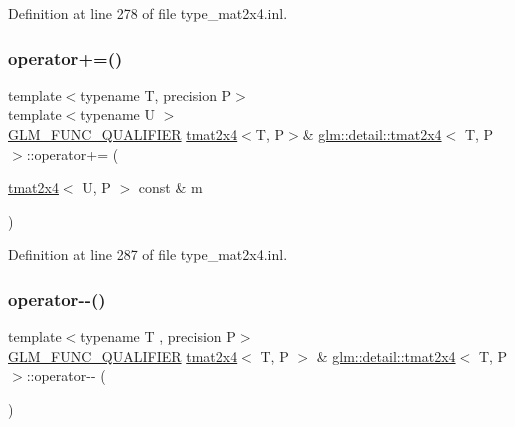 Definition at line 278 of file type\+\_\+mat2x4.\+inl.

\mbox{\label{structglm_1_1detail_1_1tmat2x4_af83887f4894721e8b28d9253fb616700}} 
\subsubsection{\texorpdfstring{operator+=()}{operator+=()}\hspace{0.1cm}{\footnotesize\ttfamily [4/4]}}
{\footnotesize\ttfamily template$<$typename T, precision P$>$ \\
template$<$typename U $>$ \\
\hyperlink{setup_8hpp_a33fdea6f91c5f834105f7415e2a64407}{G\+L\+M\+\_\+\+F\+U\+N\+C\+\_\+\+Q\+U\+A\+L\+I\+F\+I\+ER} \hyperlink{structglm_1_1detail_1_1tmat2x4}{tmat2x4}$<$T, P$>$\& \hyperlink{structglm_1_1detail_1_1tmat2x4}{glm\+::detail\+::tmat2x4}$<$ T, P $>$\+::operator+= (\begin{DoxyParamCaption}\item[{\hyperlink{structglm_1_1detail_1_1tmat2x4}{tmat2x4}$<$ U, P $>$ const \&}]{m }\end{DoxyParamCaption})}



Definition at line 287 of file type\+\_\+mat2x4.\+inl.

\mbox{\label{structglm_1_1detail_1_1tmat2x4_a556fd133fa224ffb3d2ebf13d727d820}} 
\subsubsection{\texorpdfstring{operator-\/-\/()}{operator--()}\hspace{0.1cm}{\footnotesize\ttfamily [1/2]}}
{\footnotesize\ttfamily template$<$typename T , precision P$>$ \\
\hyperlink{setup_8hpp_a33fdea6f91c5f834105f7415e2a64407}{G\+L\+M\+\_\+\+F\+U\+N\+C\+\_\+\+Q\+U\+A\+L\+I\+F\+I\+ER} \hyperlink{structglm_1_1detail_1_1tmat2x4}{tmat2x4}$<$ T, P $>$ \& \hyperlink{structglm_1_1detail_1_1tmat2x4}{glm\+::detail\+::tmat2x4}$<$ T, P $>$\+::operator-\/-\/ (\begin{DoxyParamCaption}{ }\end{DoxyParamCaption})}



